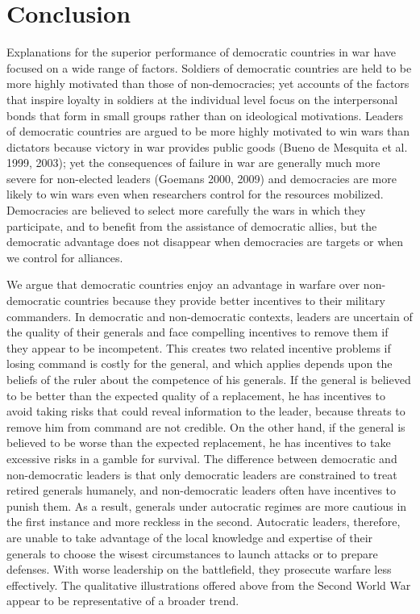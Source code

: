 \documentclass[11pt,]{article}
\begin{document}
\section{Conclusion}
Explanations for the superior performance of democratic countries in war have focused on a wide range of factors.  Soldiers of democratic countries are held to be more highly motivated than those of non-democracies; yet accounts of the factors that inspire loyalty in soldiers at the individual level focus on the interpersonal bonds that form in small groups rather than on ideological motivations.  Leaders of democratic countries are argued to be more highly motivated to win wars than dictators because victory in war provides public goods (Bueno de Mesquita et al. 1999, 2003); yet the consequences of failure in war are generally much more severe for non-elected leaders (Goemans 2000, 2009) and democracies are more likely to win wars even when researchers control for the resources mobilized.  Democracies are believed to select more carefully the wars in which they participate, and to benefit from the assistance of democratic allies, but the democratic advantage does not disappear when democracies are targets or when we control for alliances.


We argue that democratic countries enjoy an advantage in warfare over non-democratic countries because they provide better incentives to their military commanders.  In democratic and non-democratic contexts, leaders are uncertain of the quality of their generals and face compelling incentives to remove them if they appear to be incompetent.  This creates two related incentive problems if losing command is costly for the general, and which applies depends upon the beliefs of the ruler about the competence of his generals.  If the general is believed to be better than the expected quality of a replacement, he has incentives to avoid taking risks that could reveal information to the leader, because threats to remove him from command are not credible.  On the other hand, if the general is believed to be worse than the expected replacement, he has incentives to take excessive risks in a gamble for survival.  The difference between democratic and non-democratic leaders is that only democratic leaders are constrained to treat retired generals humanely, and non-democratic leaders often have incentives to punish them.  As a result, generals under autocratic regimes are more cautious in the first instance and more reckless in the second.  Autocratic leaders, therefore, are unable to take advantage of the local knowledge and expertise of their generals to choose the wisest circumstances to launch attacks or to prepare defenses.  With worse leadership on the battlefield, they prosecute warfare less effectively.  The qualitative illustrations offered above from the Second World War appear to be representative of a broader trend.  
\end{document}
